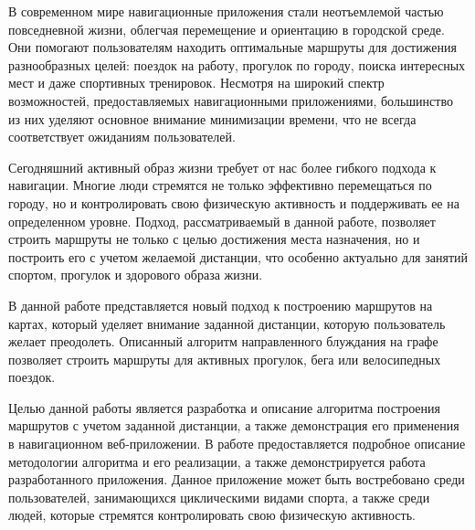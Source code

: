 В современном мире навигационные приложения стали неотъемлемой частью повседневной жизни, облегчая перемещение и ориентацию в городской среде. Они помогают пользователям находить оптимальные маршруты для достижения разнообразных целей: поездок на работу, прогулок по городу, поиска интересных мест и даже спортивных тренировок. Несмотря на широкий спектр возможностей, предоставляемых навигационными приложениями, большинство из них уделяют основное внимание минимизации времени, что не всегда соответствует ожиданиям пользователей.

Сегодняшний активный образ жизни требует от нас более гибкого подхода к навигации. Многие люди стремятся не только эффективно перемещаться по городу, но и контролировать свою физическую активность и поддерживать ее на определенном уровне. Подход, рассматриваемый в данной работе, позволяет строить маршруты не только с целью достижения места назначения, но и построить его с учетом желаемой дистанции, что особенно актуально для занятий спортом, прогулок и здорового образа жизни.

В данной работе представляется новый подход к построению маршрутов на картах, который уделяет внимание заданной дистанции, которую пользователь желает преодолеть. Описанный алгоритм направленного блуждания на графе позволяет строить маршруты для активных прогулок, бега или велосипедных поездок.

Целью данной работы является разработка и описание алгоритма построения маршрутов с учетом заданной дистанции, а также демонстрация его применения в навигационном веб-приложении. В работе предоставляется подробное описание методологии алгоритма и его реализации, а также демонстрируется работа разработанного приложения. Данное приложение может быть востребовано среди пользователей, занимающихся циклическими видами спорта, а также среди людей, которые стремятся контролировать свою физическую активность.
